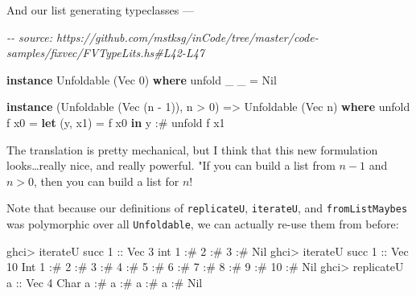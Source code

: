 \documentclass[]{article}
\newenvironment{Shaded}{}{}
\newcommand{\CharTok}[1]{\textcolor[rgb]{0.25,0.44,0.63}{#1}}
\newcommand{\CommentTok}[1]{\textcolor[rgb]{0.38,0.63,0.69}{\textit{#1}}}
\newcommand{\DataTypeTok}[1]{\textcolor[rgb]{0.56,0.13,0.00}{#1}}
\newcommand{\DecValTok}[1]{\textcolor[rgb]{0.25,0.63,0.44}{#1}}
\newcommand{\FunctionTok}[1]{\textcolor[rgb]{0.02,0.16,0.49}{#1}}
\newcommand{\KeywordTok}[1]{\textcolor[rgb]{0.00,0.44,0.13}{\textbf{#1}}}
\newcommand{\NormalTok}[1]{#1}
\newcommand{\OperatorTok}[1]{\textcolor[rgb]{0.40,0.40,0.40}{#1}}
\newcommand{\OtherTok}[1]{\textcolor[rgb]{0.00,0.44,0.13}{#1}}
\begin{document}
And our list generating typeclasses ---

\begin{Shaded}
\begin{Highlighting}[]
\CommentTok{{-}{-} source: https://github.com/mstksg/inCode/tree/master/code{-}samples/fixvec/FVTypeLits.hs\#L42{-}L47}

\KeywordTok{instance} \DataTypeTok{Unfoldable}\NormalTok{ (}\DataTypeTok{Vec} \DecValTok{0}\NormalTok{) }\KeywordTok{where}
\NormalTok{    unfold \_ \_ }\OtherTok{=} \DataTypeTok{Nil}

\KeywordTok{instance}\NormalTok{ (}\DataTypeTok{Unfoldable}\NormalTok{ (}\DataTypeTok{Vec}\NormalTok{ (n }\OperatorTok{{-}} \DecValTok{1}\NormalTok{)), n }\OperatorTok{>} \DecValTok{0}\NormalTok{) }\OtherTok{=>} \DataTypeTok{Unfoldable}\NormalTok{ (}\DataTypeTok{Vec}\NormalTok{ n) }\KeywordTok{where}
\NormalTok{    unfold f x0 }\OtherTok{=} \KeywordTok{let}\NormalTok{ (y, x1) }\OtherTok{=}\NormalTok{ f x0}
                  \KeywordTok{in}\NormalTok{  y }\OperatorTok{:\#}\NormalTok{ unfold f x1}
\end{Highlighting}
\end{Shaded}

The translation is pretty mechanical, but I think that this new formulation
looks\ldots really nice, and really powerful. "If you can build a list from
\(n - 1\) and \(n > 0\), then you can build a list for \(n\)!

Note that because our definitions of \texttt{replicateU}, \texttt{iterateU}, and
\texttt{fromListMaybes} was polymorphic over all \texttt{Unfoldable}, we can
actually re-use them from before:

\begin{Shaded}
\begin{Highlighting}[]
\NormalTok{ghci}\OperatorTok{>}\NormalTok{ iterateU }\FunctionTok{succ} \DecValTok{1}\OtherTok{ ::} \DataTypeTok{Vec} \DecValTok{3}\NormalTok{ int}
\DecValTok{1} \OperatorTok{:\#} \DecValTok{2} \OperatorTok{:\#} \DecValTok{3} \OperatorTok{:\#} \DataTypeTok{Nil}
\NormalTok{ghci}\OperatorTok{>}\NormalTok{ iterateU }\FunctionTok{succ} \DecValTok{1}\OtherTok{ ::} \DataTypeTok{Vec} \DecValTok{10} \DataTypeTok{Int}
\DecValTok{1} \OperatorTok{:\#} \DecValTok{2} \OperatorTok{:\#} \DecValTok{3} \OperatorTok{:\#} \DecValTok{4} \OperatorTok{:\#} \DecValTok{5} \OperatorTok{:\#} \DecValTok{6} \OperatorTok{:\#} \DecValTok{7} \OperatorTok{:\#} \DecValTok{8} \OperatorTok{:\#} \DecValTok{9} \OperatorTok{:\#} \DecValTok{10} \OperatorTok{:\#} \DataTypeTok{Nil}
\NormalTok{ghci}\OperatorTok{>}\NormalTok{ replicateU }\CharTok{\textquotesingle{}a\textquotesingle{}}\OtherTok{ ::} \DataTypeTok{Vec} \DecValTok{4} \DataTypeTok{Char}
\CharTok{\textquotesingle{}a\textquotesingle{}} \OperatorTok{:\#} \CharTok{\textquotesingle{}a\textquotesingle{}} \OperatorTok{:\#} \CharTok{\textquotesingle{}a\textquotesingle{}} \OperatorTok{:\#} \CharTok{\textquotesingle{}a\textquotesingle{}} \OperatorTok{:\#} \DataTypeTok{Nil}
\end{Highlighting}
\end{Shaded}
\end{document}
